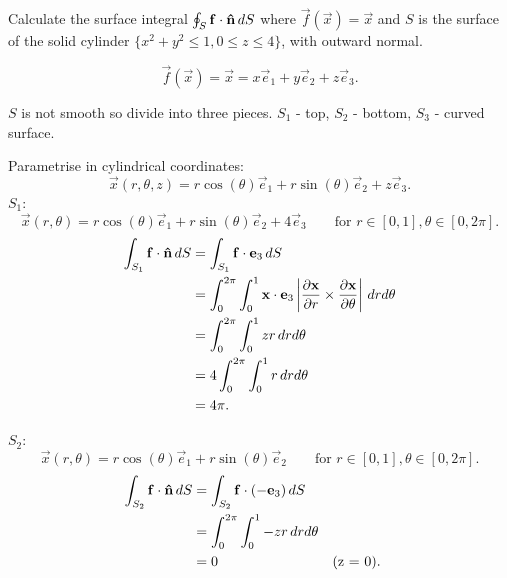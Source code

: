 \documentclass[10pt, a4paper]{article}
\begin{document}
\begin{problem}[$2020$ question $5$(a)]
    Calculate the surface integral $\oint_{S}\vec{f}\cdot\hvec{n}\,dS$ where $\vec{f}(\vec{x}) = \vec{x}$ and $S$ is the surface of the solid cylinder $\{x ^ 2 + y ^ 2 \leq 1, 0 \leq z \leq 4\}$,
    with outward normal.

    \begin{solution}
        \[
        \vec{f}(\vec{x}) = \vec{x} = x\vec{e}_1 + y\vec{e}_2 + z\vec{e}_3.
        \]

        $S$ is not smooth so divide into three pieces.
        $S_1$ -
        top,
        $S_2$ -
        bottom,
        $S_3$ -
        curved surface.

        Parametrise in cylindrical coordinates:
        \[
        \vec{x}(r, \theta, z) = r\cos(\theta)\vec{e}_1 + r\sin(\theta)\vec{e}_2 + z\vec{e}_3.
        \]
        $S_1$:
        \[
        \vec{x}(r, \theta) = r\cos(\theta)\vec{e}_1 + r\sin(\theta)\vec{e}_2 + 4\vec{e}_3\qquad\text{for } r \in [0, 1], \theta \in [0, 2\pi].
        \]
        \begin{align*}
            \int_{S_1}\vec{f}\cdot\hvec{n}\,dS &= \int_{S_1}\vec{f}\cdot\vec{e}_3\,dS \\
            &= \int_{0}^{2\pi}\int_{0}^{1}\vec{x}\cdot\vec{e}_3\left|\pd[\vec{x}]{r}\times\pd[\vec{x}]{\theta}\right|\,drd\theta \\
            &= \int_{0}^{2\pi}\int_{0}^{1}zr\,drd\theta \\
            &= 4\int_{0}^{2\pi}\int_{0}^{1}r\,drd\theta \\
            &= 4\pi.
        \end{align*}

        $S_2$:
        \[
        \vec{x}(r, \theta) = r\cos(\theta)\vec{e}_1 + r\sin(\theta)\vec{e}_2\qquad\text{for } r \in [0, 1], \theta \in [0, 2\pi].
        \]
        \begin{align*}
            \int_{S_2}\vec{f}\cdot\hvec{n}\,dS &= \int_{S_2}\vec{f}\cdot(-\vec{e}_3)\,dS \\
            &= \int_{0}^{2\pi}\int_{0}^{1}-zr\,drd\theta \\
            &= 0 &&(\text{z = 0}).
        \end{align*}



\end{solution}
\end{problem}
\end{document}
